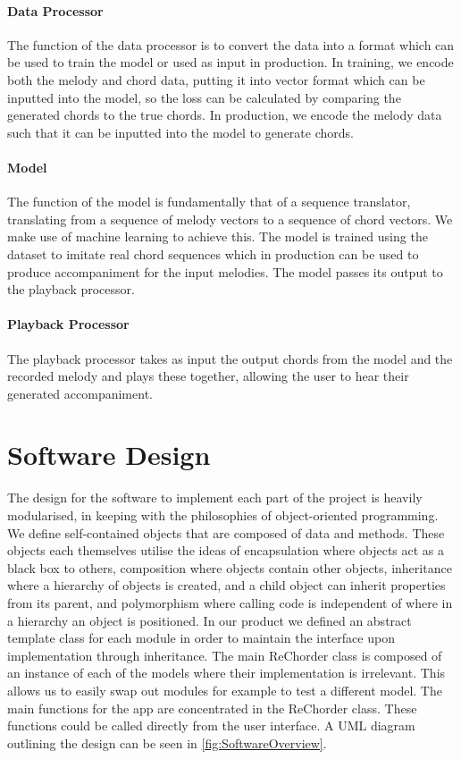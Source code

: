 \paragraph{Data Processor}

The function of the data processor is to convert the data into a format which can be used to train the model or used as input in production.
In training, we encode both the melody and chord data, putting it into vector format which can be inputted into the model, so the loss can be calculated by comparing the generated chords to the true chords.
In production, we encode the melody data such that it can be inputted into the model to generate chords.

\paragraph{Model}

The function of the model is fundamentally that of a sequence translator, translating from a sequence of melody vectors to a sequence of chord vectors.
We make use of machine learning to achieve this. 
The model is trained using the dataset to imitate real chord sequences which in production can be used to produce accompaniment for the input melodies.
The model passes its output to the playback processor.
\paragraph{Playback Processor}

The playback processor takes as input the output chords from the model and the recorded melody and plays these together, allowing the user to hear their generated accompaniment.
\section{Software Design}

The design for the software to implement each part of the project is heavily modularised, in keeping with the philosophies of object-oriented programming. 
We define self-contained objects that are composed of data and methods.
These objects each themselves utilise the ideas of encapsulation where objects act as a black box to others, composition where objects contain other objects, inheritance where a hierarchy of objects is created, and a child object can inherit properties from its parent, and polymorphism where calling code is independent of where in a hierarchy an object is positioned.
In our product we defined an abstract template class for each module in order to maintain the interface upon implementation through inheritance.
The main ReChorder class is composed of an instance of each of the models where their implementation is irrelevant.
This allows us to easily swap out modules for example to test a different model.
The main functions for the app are concentrated in the ReChorder class.
These functions could be called directly from the user interface.
A UML diagram outlining the design can be seen in \cref{fig:SoftwareOverview}.


